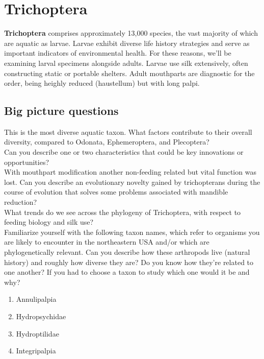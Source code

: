 \documentclass[letterpaper, 11pt]{article}
\begin{document}
\FloatBarrier
\section{Trichoptera}

\noindent{}\textbf{Trichoptera} comprises approximately 13,000 species,  %
the vast majority of which are aquatic as larvae. Larvae exhibit diverse life history strategies and serve as important indicators of environmental health. For these reasons, we'll be examining larval specimens alongside adults. Larvae use silk extensively, often constructing static or portable shelters. Adult mouthparts are diagnostic for the order, being heighly reduced (haustellum) but with long palpi.

\subsection*{Big picture questions}

\noindent{}This is the most diverse aquatic taxon. What factors contribute to their overall diversity, compared to Odonata, Ephemeroptera, and Plecoptera?\\

\noindent{}Can you describe one or two characteristics that could be key innovations or opportunities?\\

\noindent{}With mouthpart modification another non-feeding related but vital function was lost. Can you describe an evolutionary novelty gained by trichopterans during the course of evolution that solves some problems associated with mandible reduction?\\

\noindent{}What trends do we see across the phylogeny of Trichoptera, with respect to feeding biology and silk use? \\

\noindent{}Familiarize yourself with the following taxon names, which refer to organisms you are likely to encounter in the northeastern USA and/or which are phylogenetically relevant. Can you describe how these arthropods live (natural history) and roughly how diverse they are? Do you know how they're related to one another? If you had to choose a taxon to study which one would it be and why?
\begin{enumerate} 
\item Annulipalpia
\item Hydropsychidae
\item Hydroptilidae
\item Integripalpia
\end{enumerate}
\end{document}
